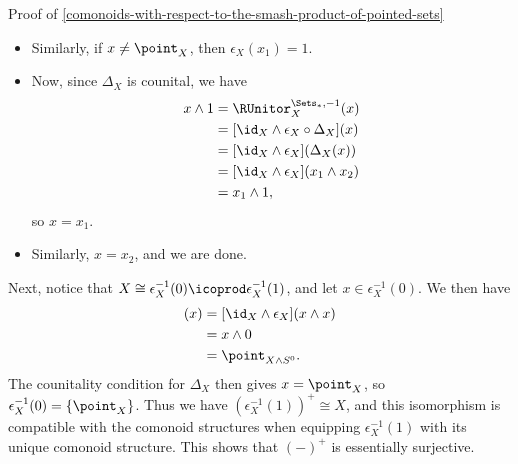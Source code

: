 \begin{Proof}{Proof of \cref{comonoids-with-respect-to-the-smash-product-of-pointed-sets}}
\begin{itemize}
\begin{align*}
                                       &= [\id_{X}\wedge\epsilon_{X}](x_{1}\wedge x_{2})\\
                                       &= [\id_{X}\wedge\epsilon_{X}](\Delta_{X}(x))\\
                                       &= [\id_{X}\wedge\epsilon_{X}\circ\Delta_{X}](x)\\
                                       &= \RUnitor^{\Sets_{*},-1}_{X}(x)\\
                                       &= x\wedge 1,
            \end{align*}
            a contradiction. Thus $\epsilon_{X}(x_{2})=1$.
        \item Similarly, if $x\neq\point_{X}$, then $\epsilon_{X}(x_{1})=1$.
        \item Now, since $\Delta_{X}$ is counital, we have
            \begin{align*}
                x\wedge 1 &= \RUnitor^{\Sets_{*},-1}_{X}(x)\\
                          &= [\id_{X}\wedge\epsilon_{X}\circ\Delta_{X}](x)\\
                          &= [\id_{X}\wedge\epsilon_{X}](\Delta_{X}(x))\\
                          &= [\id_{X}\wedge\epsilon_{X}](x_{1}\wedge x_{2})\\
                          &= x_{1}\wedge 1,
            \end{align*}
            so $x=x_{1}$.
        \item Similarly, $x=x_{2}$, and we are done.
    \end{itemize}
    Next, notice that $X\cong\epsilon^{-1}_{X}(0)\icoprod\epsilon^{-1}_{X}(1)$, and let $x\in\epsilon^{-1}_{X}(0)$. We then have
    \begin{align*}
        [(\id_{X}\wedge\epsilon_{X})\circ\Delta_{X}](x) &= [\id_{X}\wedge\epsilon_{X}](x\wedge x)\\
                                                        &= x\wedge 0\\
                                                        &= \point_{X\wedge S^{0}}.
    \end{align*}
    The counitality condition for $\Delta_{X}$ then gives $x=\point_{X}$, so $\epsilon^{-1}_{X}(0)=\{\point_{X}\}$. Thus we have $(\epsilon^{-1}_{X}(1))^{+}\cong X$, and this isomorphism is compatible with the comonoid structures when equipping $\epsilon^{-1}_{X}(1)$ with its unique comonoid structure. This shows that $(-)^{+}$ is essentially surjective.


\end{Proof}
